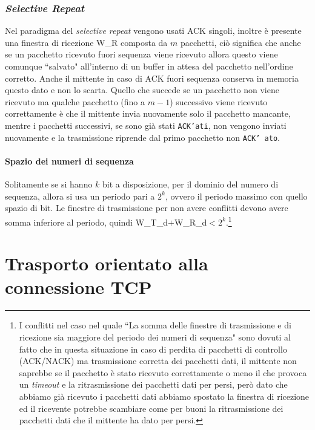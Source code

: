         \subsubsection{\textit{Selective Repeat}}
            Nel paradigma del \textit{selective repeat} vengono usati \Acrshort*{ACK} singoli, inoltre è presente una finestra di ricezione \Acrshort*{W_R} composta da $ m $ pacchetti, ciò significa che anche se un pacchetto ricevuto fuori sequenza viene ricevuto allora questo viene comunque ``salvato" all'interno di un buffer in attesa del pacchetto nell'ordine corretto. Anche il mittente in caso di \Acrshort*{ACK} fuori sequenza conserva in memoria questo dato e non lo scarta. Quello che succede se un pacchetto non viene ricevuto ma qualche pacchetto (fino a $m-1$) successivo viene ricevuto correttamente è che il mittente invia nuovamente solo il pacchetto mancante, mentre i pacchetti successivi, se sono già stati \texttt{ACK'ati}, non vengono inviati nuovamente e la trasmissione riprende dal primo pacchetto non \texttt{ACK' ato}.
        \paragraph{Spazio dei numeri di sequenza}
            Solitamente se si hanno $ k $ bit a disposizione, per il dominio del numero di sequenza, allora si usa un periodo pari a $ 2^k $, ovvero il periodo massimo con quello spazio di bit. Le finestre di trasmissione per non avere conflitti devono avere somma inferiore al periodo, quindi \Acrshort*{W_T_d}$+$\Acrshort*{W_R_d}$< 2^k $.\footnote{I conflitti nel caso nel quale ``La somma delle finestre di trasmissione e di ricezione sia maggiore del periodo dei numeri di sequenza" sono dovuti al fatto che in questa situazione in caso di perdita di pacchetti di controllo (\Acrshort*{ACK}/\Acrshort*{NACK}) ma trasmissione corretta dei pacchetti dati, il mittente non saprebbe se il pacchetto è stato ricevuto correttamente o meno il che provoca un \textit{timeout} e la ritrasmissione dei pacchetti dati per persi, però dato che abbiamo già ricevuto i pacchetti dati abbiamo spostato la finestra di ricezione ed il ricevente potrebbe scambiare come per buoni la ritrasmissione dei pacchetti dati che il mittente ha dato per persi.} 
\section[Trasporto Orientato Connessione \texttt{TCP}]{Trasporto orientato alla connessione \Acrshort*{TCP}}
